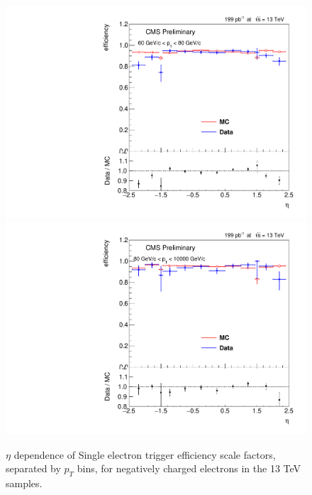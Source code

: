 \begin{figure}
\includegraphics[width=0.48\linewidth]{plots/efficiency/13_zeehlt_negative/PtBins_eta_pt10.pdf}
\includegraphics[width=0.48\linewidth]{plots/efficiency/13_zeehlt_negative/PtBins_eta_pt11.pdf}
\caption{$\eta$ dependence of Single electron trigger efficiency scale factors, separated by $p_T$ bins, for negatively charged electrons in the 13 TeV samples.}
\label{fig:Eff:el:13:HLT:neg}
\end{figure}
